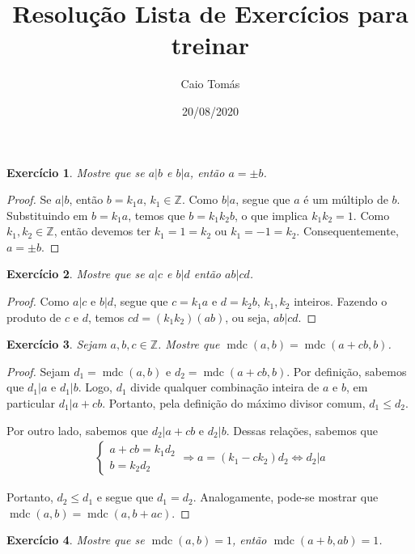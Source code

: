 \documentclass[a4paper,12pt]{article}
\title{Resolução Lista de Exercícios para treinar}
\date{20/08/2020}
\author{Caio Tomás}
\DeclareMathOperator{\mdc}{mdc}
\newtheorem{exercise}{Exercício}%
\begin{document}
	\maketitle 
	\begin{exercise}
		Mostre que se $a|b$ e $b|a$, então $a = \pm b$.
	\end{exercise}
	\begin{proof}
		Se $a|b$, então $b = k_1a$, $k_1\in\mathbb{Z}$. Como $b|a$, segue que $a$ é um múltiplo de $b$. Substituindo em $b = k_1a$, temos que $b = k_1k_2b$, o que implica $k_1k_2 = 1$. Como $k_1, k_2\in\mathbb{Z}$, então devemos ter $k_1 = 1 = k_2$ ou $k_1 = -1 = k_2$. Consequentemente, $a = \pm b$.
	\end{proof}
	\begin{exercise}
		Mostre que se $a|c$ e $b|d$ então $ab|cd$.
	\end{exercise}
	\begin{proof}
		Como $a|c$ e $b|d$, segue que $c = k_1a$ e $d = k_2b$, $k_1, k_2$ inteiros. Fazendo o produto de $c$ e $d$, temos $cd = (k_1k_2)(ab)$, ou seja, $ab|cd$.
	\end{proof}
	\begin{exercise}
		Sejam $a,b,c\in\mathbb{Z}$. Mostre que $\mdc(a,b) = \mdc(a+cb, b) $.
	\end{exercise}
	\begin{proof}
		Sejam $d_1 = \mdc(a,b)$ e $d_2 = \mdc(a+cb, b)$. Por definição, sabemos que $d_1|a$ e $d_1|b$. Logo, $d_1$ divide qualquer combinação inteira de $a$ e $b$, em particular $d_1|a + cb$. Portanto, pela definição do máximo divisor comum, $d_1\leq d_2$.
		\par Por outro lado, sabemos que $d_2| a+cb$ e $d_2|b$. Dessas relações, sabemos que
		\begin{align*} 
		\begin{cases}
		a+cb = k_1d_2 \\
		b = k_2d_2
		\end{cases} \Rightarrow 
		a = (k_1 - ck_2)d_2 \Leftrightarrow d_2|a
		\end{align*} 
		\par Portanto, $d_2\leq d_1$ e segue que $d_1 = d_2$. Analogamente, pode-se mostrar que $\mdc(a,b) = \mdc(a, b+ac)$. 
	\end{proof}
	\begin{exercise}
		Mostre que se $\mdc(a,b) = 1$, então $\mdc(a+b, ab) = 1$.
	\end{exercise}
\end{document}
